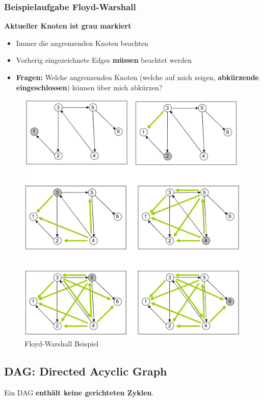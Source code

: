 \subsubsection{Beispielaufgabe Floyd-Warshall}
\textbf{Aktueller Knoten ist grau markiert}
\begin{itemize}
	\item Immer die angrenzenden Knoten beachten
	\item Vorherig eingezeichnete Edges \textbf{müssen} beachtet werden
	\item \textbf{Fragen: } 
		\subitem Welche angrenzenden Knoten (welche auf mich zeigen, \textbf{abkürzende eingeschlossen}) können über mich abkürzen?
\end{itemize}
\begin{figure}[h]
	\centering
	\includegraphics[width=0.9\linewidth]{images/floyd}
	\caption{Floyd-Warshall Beispiel}
	\label{fig:floydwarshallbeispiel}
\end{figure}
\clearpage

\subsection{DAG: Directed Acyclic Graph}
Ein DAG \textbf{enthält keine gerichteten Zyklen}.

